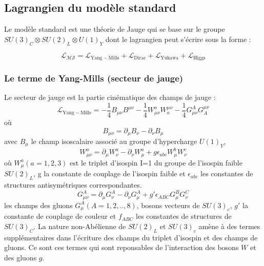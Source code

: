 \subsection{Lagrangien du modèle standard}
Le modèle standard est une théorie de Jauge qui se base sur le groupe $SU(3)_{C} \otimes SU(2)_{L} \otimes U(1)_{Y}$ dont le lagrangien peut s'écrire sous la forme :

\begin{equation}
\mathcal{L_{MS}}=\mathcal{L}_{\mathrm{Yang-Mills}}+\mathcal{L}_{\mathrm{Dirac}}+\mathcal{L}_{\mathrm{Yukawa}}+\mathcal{L}_{\mathrm{Higgs}}
\end{equation}

\subsubsection{Le terme de Yang-Mills (secteur de jauge)}
Le secteur de jauge est la partie cinématique des champs de jauge :
\begin{equation}
\mathcal{L}_{\mathrm{Yang-Mills}}=-\frac{1}{4}B_{\mu\nu}B^{\mu\nu}-\frac{1}{4}W_{\mu\nu}^{a}W_{a}^{\mu\nu}-\frac{1}{4}G_{\mu\nu}^{A}G_{A}^{\mu\nu}
\end{equation}
où 
\begin{equation}
B_{\mu\nu}=\partial_{\mu}B_{\nu}-\partial_{\nu}B_{\mu}
\end{equation}
avec $B_{\mu}$ le champ isoscalaire associé au groupe d'hypercharge $U(1)_{Y}$,
\begin{equation}
W_{\mu\nu}^{a}=\partial_{\mu}W_{\nu}^{a}-\partial_{\nu}W_{\mu}^{a}+g\epsilon_{abc}W_{\mu}^{b}W_{\nu}^{c}
\end{equation}
où $W_{\mu}^{a} (a=1,2,3)$ est le triplet d'isospin I=1 du groupe de l'isospin faible $SU(2)_{L}$, g la constante de couplage de l'isospin faible et $\epsilon_{abc}$ les constantes de structures antisymétriques correspondantes.  
\begin{equation}
G_{\mu\nu}^{A}=\partial_{\mu}G_{\nu}^{A}-\partial_{\nu}G_{\mu}^{A}+g'\epsilon_{ABC}G_{\mu}^{B}G_{\nu}^{C}
\end{equation}
les champs des gluons $G_{\mu}^{A} (A=1,2,..,8)$, bosons vecteurs de $SU(3)_{c}$, $g'$ la constante de couplage de couleur et $f_{ABC}$ les constantes de structures de $SU(3)_{C}$.
La nature non-Abélienne de $SU(2)_{L}$ et $SU(3)_{c}$ amène à des termes supplémentaires dans l'écriture des champs du triplet d'isospin et des champs de gluons. Ce sont ces termes qui sont reponsables de l'interaction des bosons $W$ et des gluons $g$.

